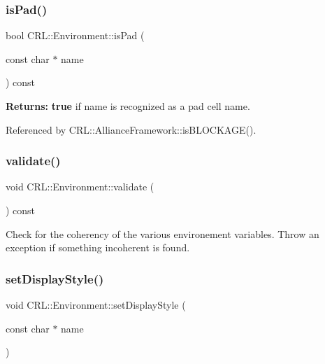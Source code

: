 \subsubsection{\texorpdfstring{is\+Pad()}{isPad()}}
{\footnotesize\ttfamily bool C\+R\+L\+::\+Environment\+::is\+Pad (\begin{DoxyParamCaption}\item[{const char $\ast$}]{name }\end{DoxyParamCaption}) const}

{\bfseries Returns\+:} {\bfseries true} if {\ttfamily name} is recognized as a pad cell name. 

Referenced by C\+R\+L\+::\+Alliance\+Framework\+::is\+B\+L\+O\+C\+K\+A\+G\+E().

\mbox{\label{classCRL_1_1Environment_a4ea88dd9784318190a3705345c47904a}} 
\subsubsection{\texorpdfstring{validate()}{validate()}}
{\footnotesize\ttfamily void C\+R\+L\+::\+Environment\+::validate (\begin{DoxyParamCaption}{ }\end{DoxyParamCaption}) const}

Check for the coherency of the various environement variables. Throw an exception if something incoherent is found. \mbox{\label{classCRL_1_1Environment_a85fa721541a39571c3ade06992035bad}} 
\subsubsection{\texorpdfstring{set\+Display\+Style()}{setDisplayStyle()}}
{\footnotesize\ttfamily void C\+R\+L\+::\+Environment\+::set\+Display\+Style (\begin{DoxyParamCaption}\item[{const char $\ast$}]{name }\end{DoxyParamCaption})\hspace{0.3cm}{\ttfamily [inline]}}

